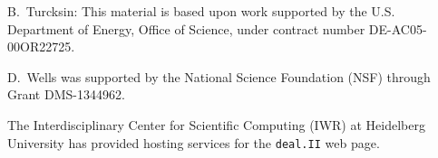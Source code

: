 \documentclass{ansarticle-preprint}
\newcommand{\specialword}[1]{\texttt{#1}}
\newcommand{\dealii}{{\specialword{deal.II}}}
\begin{document}
%
B.~Turcksin: This material is based upon work supported by the U.S. Department of
Energy, Office of Science, under contract number DE-AC05-00OR22725.

D.~Wells was supported by the National Science Foundation (NSF) through Grant
DMS-1344962.

The Interdisciplinary Center for Scientific Computing (IWR) at Heidelberg University has provided
hosting services for the \dealii{} web page.


{}

\end{document}
